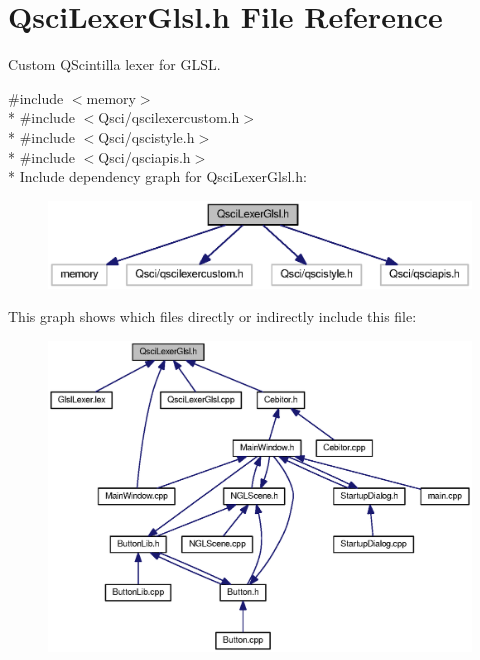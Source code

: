\section{Qsci\-Lexer\-Glsl.\-h File Reference}
\label{_qsci_lexer_glsl_8h}


Custom Q\-Scintilla lexer for G\-L\-S\-L.  


{\ttfamily \#include $<$memory$>$}\\*
{\ttfamily \#include $<$Qsci/qscilexercustom.\-h$>$}\\*
{\ttfamily \#include $<$Qsci/qscistyle.\-h$>$}\\*
{\ttfamily \#include $<$Qsci/qsciapis.\-h$>$}\\*
Include dependency graph for Qsci\-Lexer\-Glsl.\-h\-:\nopagebreak
\begin{figure}[H]
\begin{center}
\leavevmode
\includegraphics[width=350pt]{_qsci_lexer_glsl_8h__incl}
\end{center}
\end{figure}
This graph shows which files directly or indirectly include this file\-:
\nopagebreak
\begin{figure}[H]
\begin{center}
\leavevmode
\includegraphics[width=350pt]{_qsci_lexer_glsl_8h__dep__incl}
\end{center}
\end{figure}
